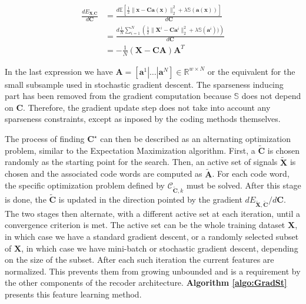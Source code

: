 \documentclass[12pt,a4paper,oneside,english]{UPBThesis}
\newcommand{\hctimes}[2]{{#1}\!\times\!{#2}}
\begin{document}
\begin{align*}
\frac{d E_{\textbf{X},\textbf{C}}}{d\textbf{C}} & = \frac{d\mathbb{E} [ \frac{1}{2} \| \textbf{x} - \textbf{C}\textbf{a}(\textbf{x}) \|_2^2 + \lambda\mathbb{S}(\textbf{a}(\textbf{x}))]}{d\textbf{C}} \\
& = \frac{d\frac{1}{N} \sum_{i=1}^N{\left( \frac{1}{2} \| \textbf{X}^i - \textbf{C}\textbf{a}^i \|_2^2 + \lambda\mathbb{S}(\textbf{a}^i)) \right)}}{d\textbf{C}} \\
& = - \frac{1}{N} \left( \textbf{X} - \textbf{C}\textbf{A} \right) \textbf{A}^T
\end{align*}

In the last expression we have $\textbf{A} = \left[ \textbf{a}^1 \left|\right. \dots \left|\right. \textbf{a}^N \right] \in \mathbb{R}^{\hctimes{w}{N}}$ or the equivalent for the small subsample used in stochastic gradient descent. The sparseness inducing part has been removed from the gradient computation because $\mathbb{S}$ does not depend on $\textbf{C}$. Therefore, the gradient update step does not take into account any sparseness constraints, except as inposed by the coding methods themselves.

The process of finding $\textbf{C}^\star$ can then be described as an alternating optimization problem, similar to the Expectation Maximization algorithm. First, a $\tilde{\textbf{C}}$ is chosen randomly as the starting point for the search. Then, an active set of signals $\tilde{\textbf{X}}$ is chosen and the associated code words are computed as $\tilde{\textbf{A}}$. For each code word, the specific optimization problem defined by $\mathcal{C}_{\tilde{\textbf{C}},k}$ must be solved. After this stage is done, the $\tilde{\textbf{C}}$ is updated in the direction pointed by the gradient $dE_{\tilde{\textbf{X}},\tilde{\textbf{C}}} / d\textbf{C}$. The two stages then alternate, with a different active set at each iteration, until a convergence criterion is met. The active set can be the whole training dataset $\textbf{X}$, in which case we have a standard gradient descent, or a randomly selected subset of $\textbf{X}$, in which case we have mini-batch or stochastic gradient descent, depending on the size of the subset. After each such iteration the current features are normalized. This prevents them from growing unbounded and is a requirement by the other components of the recoder architecture. \textbf{Algorithm \ref{algo:GradSt}} presents this feature learning method.
\end{document}
